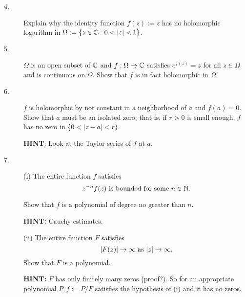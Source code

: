 \documentclass{article}
\begin{document}
\begin{description}
\item[4.]
Explain why the identity function $f(z) := z$ has no holomorphic
logarithm in $\Omega := \{z \in \Bbb C : 0 < |z| < 1\}$.

\item[5.]
$\Omega$ is an open subset of $\Bbb C$ and $f : \Omega \to \Bbb C$ satisfies
$e^{f(z)} = z$ for all $z \in \Omega$ and is continuous on $\Omega$. Show
that $f$ is in fact holomorphic in $\Omega$.

\item[6.]
$f$ is holomorphic by not constant in a neighborhood of $a$ and $f(a) = 0$.
Show that $a$ must be an isolated zero; that is, if $r>0$ is small enough,
$f$ has no zero in $\{0 < |z-a| < r\}$.

{\bf HINT}: Look at the Taylor series of $f$ at $a$.

\item[7.] (i)
The entire function $f$ satisfies
$$z^{-n} f(z) \hbox{\ is\ } \hbox{bounded\ } \hbox{for\ } \hbox{some\ }
  n \in \Bbb N.$$

Show that $f$ is a polynomial of degree no greater than $n$.

{\bf HINT:} Cauchy estimates.

\item[\quad] (ii)
The entire function $F$ satisfies
$$|F(z)| \to \infty \hbox{\ as\ } |z| \to \infty.$$
Show that $F$ is a polynomial.

{\bf HINT:} $F$ has only finitely many zeros (proof?). So for an appropriate
polynomial $P, f := P/F$ satisfies the hypothesis of (i) and it has no zeros.





\end{description}    
\end{document}
